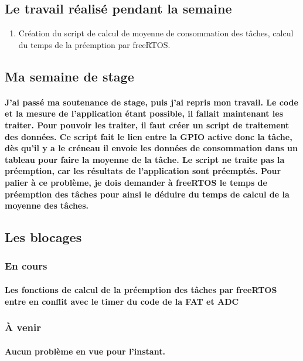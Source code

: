 \documentclass[a4paper]{article}
\begin{document}
 \subsection{Le travail réalisé pendant la semaine}
 \begin{enumerate}
\item{Création du script de calcul de moyenne de consommation des tâches, calcul du temps de la préemption par freeRTOS.}
\end{enumerate}

\subsection{Ma semaine de stage}
    \paragraph{J'ai passé ma soutenance de stage, puis j'ai repris mon travail. Le code et la mesure de l'application étant possible, il fallait maintenant les traiter. Pour pouvoir les traiter, il faut créer un script de traitement des données. Ce script fait le lien entre la GPIO active donc la tâche, dès qu'il y a le créneau il envoie les données de consommation dans un tableau pour faire la moyenne de la tâche. Le script ne traite pas la préemption, car les résultats de l'application sont préemptés. Pour palier à ce problème, je dois demander à freeRTOS le temps de préemption des tâches pour ainsi le déduire du temps de calcul de la moyenne des tâches. }
    
    \subsection{Les blocages}
\subsubsection{En cours}
    \paragraph{Les fonctions de calcul de la préemption des tâches par freeRTOS entre en conflit avec le timer du code de la FAT et ADC}
\subsubsection{À venir}
    \paragraph{Aucun problème en vue pour l'instant.}
	\paragraph{}
\end{document}

